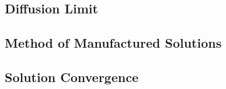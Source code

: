 
\subsection{Diffusion Limit}

\subsection{Method of Manufactured Solutions}

\subsection{Solution Convergence}